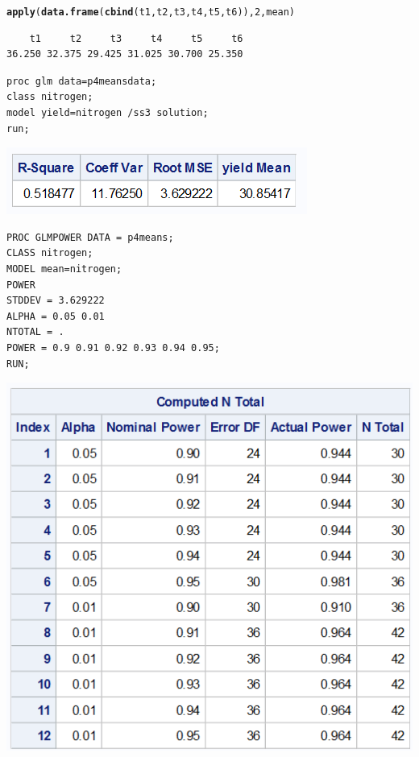 \documentclass{article}\usepackage[]{graphicx}\usepackage[]{color}
\makeatletter
\newcommand{\hlnum}[1]{\textcolor[rgb]{0.686,0.059,0.569}{#1}}%
\newcommand{\hlstd}[1]{\textcolor[rgb]{0.345,0.345,0.345}{#1}}%
\newcommand{\hlkwd}[1]{\textcolor[rgb]{0.737,0.353,0.396}{\textbf{#1}}}%
\newenvironment{kframe}{%
 \def\at@end@of@kframe{}%
 \ifinner\ifhmode%
  \def\at@end@of@kframe{\end{minipage}}%
  \begin{minipage}{\columnwidth}%
 \fi\fi%
 \def\FrameCommand##1{\hskip\@totalleftmargin \hskip-\fboxsep
 \colorbox{shadecolor}{##1}\hskip-\fboxsep
     \hskip-\linewidth \hskip-\@totalleftmargin \hskip\columnwidth}%
 \MakeFramed {\advance\hsize-\width
   \@totalleftmargin\z@ \linewidth\hsize
   \@setminipage}}%
 {\par\unskip\endMakeFramed%
 \at@end@of@kframe}
\newenvironment{knitrout}{}{} %
\makeatother
\begin{document}
\begin{enumerate}
\begin{knitrout}
\begin{kframe}
\begin{alltt}
\hlkwd{apply}\hlstd{(}\hlkwd{data.frame}\hlstd{(}\hlkwd{cbind}\hlstd{(t1,t2,t3,t4,t5,t6)),} \hlnum{2}\hlstd{, mean)}
\end{alltt}
\begin{verbatim}
    t1     t2     t3     t4     t5     t6 
36.250 32.375 29.425 31.025 30.700 25.350 
\end{verbatim}
\end{kframe}
\end{knitrout}

\begin{verbatim}
proc glm data=p4meansdata;
class nitrogen;
model yield=nitrogen /ss3 solution;
run;
\end{verbatim}

\includegraphics{prob4rmse}

\begin{verbatim}
PROC GLMPOWER DATA = p4means;
CLASS nitrogen;
MODEL mean=nitrogen;
POWER
STDDEV = 3.629222
ALPHA = 0.05 0.01
NTOTAL = .
POWER = 0.9 0.91 0.92 0.93 0.94 0.95;
RUN;
\end{verbatim}

\begin{center}
\includegraphics[scale=0.5]{prob4power}
\end{center}


\end{enumerate}
\end{document}
